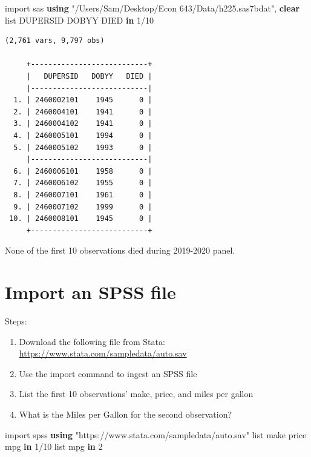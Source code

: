 \documentclass[
]{book}
\newenvironment{Shaded}{\begin{snugshade}}{\end{snugshade}}
\newcommand{\KeywordTok}[1]{\textcolor[rgb]{0.13,0.29,0.53}{\textbf{#1}}}
\newcommand{\NormalTok}[1]{#1}
\newcommand{\OtherTok}[1]{\textcolor[rgb]{0.56,0.35,0.01}{#1}}
\newcommand{\StringTok}[1]{\textcolor[rgb]{0.31,0.60,0.02}{#1}}
\providecommand{\tightlist}{%
  \setlength{\itemsep}{0pt}\setlength{\parskip}{0pt}}
\begin{document}
\begin{Shaded}
\begin{Highlighting}[]
\NormalTok{import sas }\KeywordTok{using} \StringTok{"/Users/Sam/Desktop/Econ 643/Data/h225.sas7bdat"}\NormalTok{, }\KeywordTok{clear}
\OtherTok{list}\NormalTok{ DUPERSID DOBYY DIED }\KeywordTok{in}\NormalTok{ 1/10}
\end{Highlighting}
\end{Shaded}

\begin{verbatim}
(2,761 vars, 9,797 obs)

     +---------------------------+
     |   DUPERSID   DOBYY   DIED |
     |---------------------------|
  1. | 2460002101    1945      0 |
  2. | 2460004101    1941      0 |
  3. | 2460004102    1941      0 |
  4. | 2460005101    1994      0 |
  5. | 2460005102    1993      0 |
     |---------------------------|
  6. | 2460006101    1958      0 |
  7. | 2460006102    1955      0 |
  8. | 2460007101    1961      0 |
  9. | 2460007102    1999      0 |
 10. | 2460008101    1945      0 |
     +---------------------------+
\end{verbatim}

None of the first 10 observations died during 2019-2020 panel.

\section{Import an SPSS file}\label{import-an-spss-file-1}

Steps:

\begin{enumerate}
\def\labelenumi{\arabic{enumi}.}
\tightlist
\item
  Download the following file from Stata: \url{https://www.stata.com/sampledata/auto.sav}
\item
  Use the import command to ingest an SPSS file
\item
  List the first 10 observations' make, price, and miles per gallon
\item
  What is the Miles per Gallon for the second observation?
\end{enumerate}

\begin{Shaded}
\begin{Highlighting}[]
\NormalTok{import spss }\KeywordTok{using} \StringTok{"https://www.stata.com/sampledata/auto.sav"}
\OtherTok{list}\NormalTok{ make price mpg }\KeywordTok{in}\NormalTok{ 1/10}
\OtherTok{list}\NormalTok{ mpg }\KeywordTok{in}\NormalTok{ 2}
\end{Highlighting}
\end{Shaded}
\end{document}
